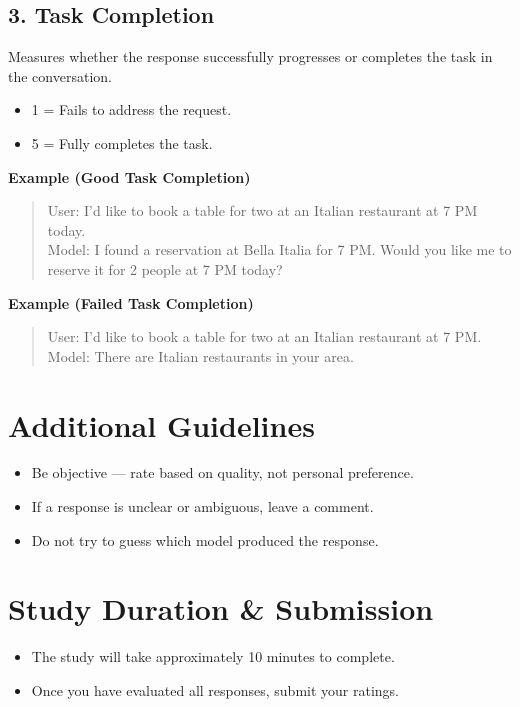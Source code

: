 \subsection*{3. Task Completion}
Measures whether the response successfully progresses or completes the task in the conversation.

\begin{itemize}
    \item 1 = Fails to address the request.
    \item 5 = Fully completes the task.
\end{itemize}

\textbf{Example (Good Task Completion)}
\begin{quote}
User: I’d like to book a table for two at an Italian restaurant at 7 PM today.\\
Model: I found a reservation at Bella Italia for 7 PM. Would you like me to reserve it for 2 people at 7 PM today?
\end{quote}

\textbf{Example (Failed Task Completion)}
\begin{quote}
User: I’d like to book a table for two at an Italian restaurant at 7 PM.\\
Model: There are Italian restaurants in your area.
\end{quote}

\section*{Additional Guidelines}
\begin{itemize}
    \item Be objective --- rate based on quality, not personal preference.
    \item If a response is unclear or ambiguous, leave a comment.
    \item Do not try to guess which model produced the response.
\end{itemize}

\section*{Study Duration \& Submission}
\begin{itemize}
    \item The study will take approximately 10 minutes to complete.
    \item Once you have evaluated all responses, submit your ratings.
\end{itemize}

\vspace{1cm}
